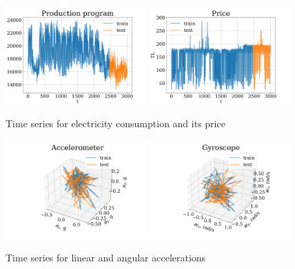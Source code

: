 \documentclass[referee, pdflatex]{sn-jnl}
\theoremstyle{definition}
\theoremstyle{plain}
\begin{document}
	\begin{figure}[h]
		\centering
		\includegraphics[width=0.48\textwidth, keepaspectratio]{../../figs/Electricity_Production}
		\includegraphics[width=0.48\textwidth, keepaspectratio]{../../figs/Electricity_Price}
		\caption{Time series for electricity consumption and its price}\label{fig:electr_data}
	\end{figure}
	
	\begin{figure}[h]
		\centering
		\includegraphics[width=0.48\textwidth, keepaspectratio]{../../figs/acceleromter.png}
		\includegraphics[width=0.48\textwidth, keepaspectratio]{../../figs/gyro.png}
		\caption{Time series for linear and angular accelerations}\label{fig:motion_data}
	\end{figure}
	
\end{document}
